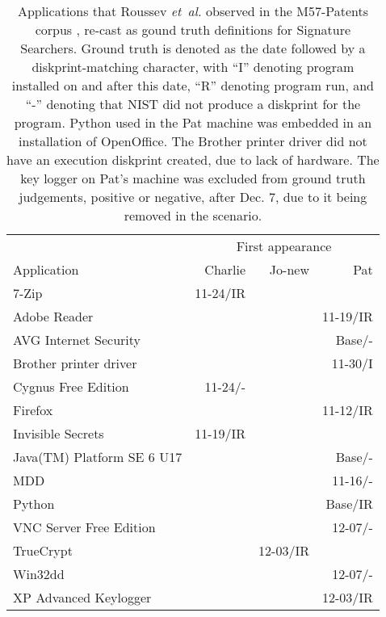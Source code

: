 \documentclass[11pt]{ucthesis}
\theoremstyle{plain}
\theoremstyle{definition}
\newcommand{\etal}{\emph{et~al.}\xspace}
\begin{document}
\begin{table}[htp]
\caption{\label{tbl:m57apps:groundtruth}Applications that Roussev \etal observed in the M57-Patents corpus \cite[pages S67--S68]{roussev:dfrws12}, re-cast as gound truth definitions for Signature Searchers.  Ground truth is denoted as the date followed by a diskprint-matching character, with ``I'' denoting program installed on and after this date, ``R'' denoting program run, and ``-'' denoting that NIST did not produce a diskprint for the program.  Python used in the Pat machine was embedded in an installation of OpenOffice.  The Brother printer driver did not have an execution diskprint created, due to lack of hardware.  The key logger on Pat's machine was excluded from ground truth judgements, positive or negative, after Dec. 7, due to it being removed in the scenario.}
\begin{center}
\begin{small}
\begin{tabular}{lrrr}
\toprule
 & \multicolumn{3}{c}{First appearance} \\
Application & Charlie & Jo-new & Pat \\
\midrule
7-Zip & 11-24/IR & & \\
Adobe Reader & & & 11-19/IR \\
AVG Internet Security & & & Base/- \\
Brother printer driver & & & 11-30/I \\
Cygnus Free Edition & 11-24/- & & \\
Firefox & & & 11-12/IR \\
Invisible Secrets & 11-19/IR & & \\
Java(TM) Platform SE 6 U17 & & & Base/- \\
MDD & & & 11-16/- \\
Python & & & Base/IR \\
VNC Server Free Edition & & & 12-07/- \\
TrueCrypt & & 12-03/IR & \\
Win32dd & & & 12-07/- \\
XP Advanced Keylogger & & & 12-03/IR \\
\bottomrule
\end{tabular}
\end{small}
\end{center}
\end{table}%
\end{document}
